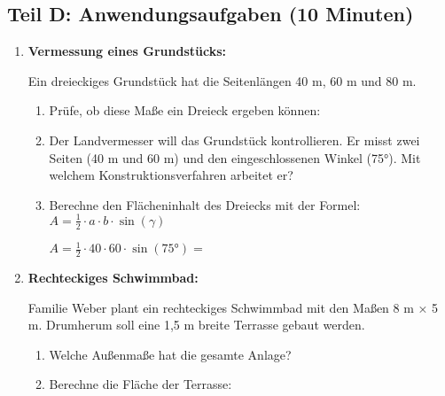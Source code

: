 \subsection*{Teil D: Anwendungsaufgaben (10 Minuten)}

\begin{enumerate}[label=\arabic*.,resume]

    \item \textbf{Vermessung eines Grundstücks:}

    Ein dreieckiges Grundstück hat die Seitenlängen 40 m, 60 m und 80 m.

    \begin{enumerate}[label=\alph*)]
        \item Prüfe, ob diese Maße ein Dreieck ergeben können:

        \vspace{2cm}

        \item Der Landvermesser will das Grundstück kontrollieren. Er misst zwei Seiten (40 m und 60 m) und den eingeschlossenen Winkel (75°). Mit welchem Konstruktionsverfahren arbeitet er?

        \vspace{1.5cm}

        \item Berechne den Flächeninhalt des Dreiecks mit der Formel: $A = \frac{1}{2} \cdot a \cdot b \cdot \sin(\gamma)$

        $A = \frac{1}{2} \cdot 40 \cdot 60 \cdot \sin(75°) = $ \underline{\hspace{6cm}}

    \end{enumerate}

    \vspace{1cm}

    \item \textbf{Rechteckiges Schwimmbad:}

    Familie Weber plant ein rechteckiges Schwimmbad mit den Maßen 8 m × 5 m. Drumherum soll eine 1,5 m breite Terrasse gebaut werden.

    \begin{enumerate}[label=\alph*)]
        \item Welche Außenmaße hat die gesamte Anlage?

        \vspace{1.5cm}

        \item Berechne die Fläche der Terrasse:

        \vspace{2cm}

    \end{enumerate}

\end{enumerate}
